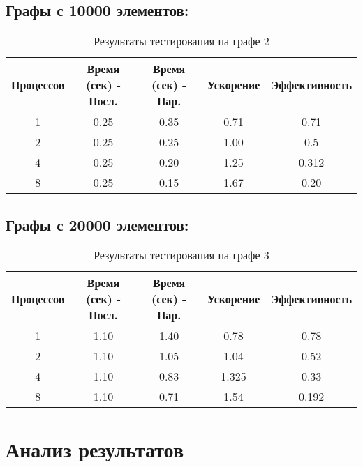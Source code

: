 \documentclass[a4paper, 14pt]{article}
\begin{document}
\subsection*{Графы с 10000 элементов:}
\begin{table}[h]
    \centering
    \begin{tabular}{|c|c|c|c|c|}
        \hline
        Процессов & Время (сек) - Посл. & Время (сек) - Пар. & Ускорение & Эффективность \\ \hline
        1         &  0.25       &   0.35     &     0.71    &  0.71    \\ \hline
        2         &   0.25      &  0.25      &      1.00   &  0.5   \\ \hline
        4         &   0.25      &  0.20     &     1.25   &   0.312    \\ \hline
		8         &   0.25      &  0.15      &     1.67   &  0.20   \\ \hline
    \end{tabular}
    \caption{Результаты тестирования на графе 2}
\end{table}

\subsection*{Графы с 20000 элементов:}
\begin{table}[h]
    \centering
    \begin{tabular}{|c|c|c|c|c|}
        \hline
        Процессов & Время (сек) - Посл. & Время (сек) - Пар. & Ускорение & Эффективность \\ \hline
        1         &  1.10      &   1.40    &     0.78    & 0.78       \\ \hline
        2         &  1.10      &  1.05    &      1.04    &  0.52    \\ \hline
        4         &   1.10     &   0.83     &     1.325    &  0.33    \\ \hline
		8         &  1.10      &   0.71     &     1.54   &  0.192    \\ \hline
    \end{tabular}
    \caption{Результаты тестирования на графе 3}
\end{table}

\newpage
    \section*{\centering Анализ результатов}
\end{document}
